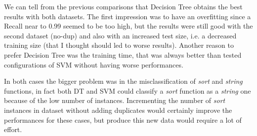 \documentclass[11pt]{article}
\begin{document}
	We can tell from the previous comparisons that Decision Tree obtains the
	best results with both datasets. The first impression was to have an overfitting
	since a Recall near to 0.99 seemed to be too high, but the results were still
	good with the second dataset (no-dup) and also with an increased test size,
	i.e. a decreased training size (that I thought should led to worse results).
	Another reason to prefer Decision Tree was the training time, that was always
	better than tested configurations of SVM without having worse performances.

	In both cases the bigger problem was in the misclassification of \textit{sort}
	and \textit{string} functions, in fact both DT and SVM could classify a \textit{sort}
	function as a \textit{string} one because of the low number of instances.
	Incrementing the number of \textit{sort} instances in dataset without
	adding duplicates would certainly improve the performances for these cases,
	but produce this new data would require a lot of effort.
\end{document}
